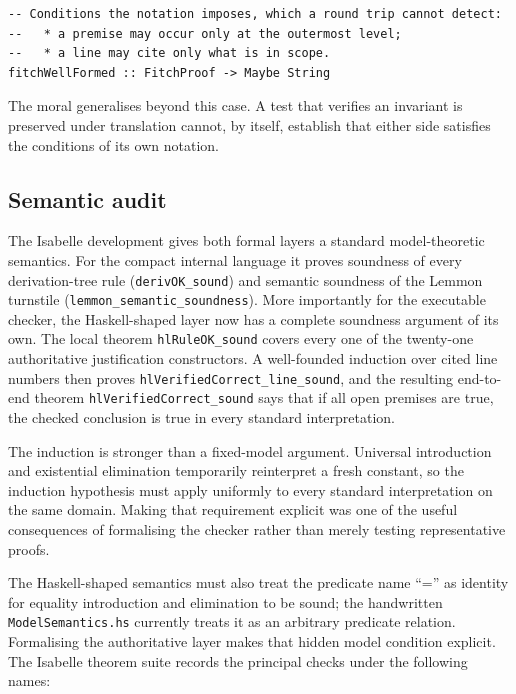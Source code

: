 \documentclass[11pt]{article}
\theoremstyle{plain}
\theoremstyle{definition}
\theoremstyle{remark}
\begin{document}
\begin{lstlisting}
-- Conditions the notation imposes, which a round trip cannot detect:
--   * a premise may occur only at the outermost level;
--   * a line may cite only what is in scope.
fitchWellFormed :: FitchProof -> Maybe String
\end{lstlisting}

\noindent The moral generalises beyond this case. A test that verifies an
invariant is preserved under translation cannot, by itself, establish that
either side satisfies the conditions of its own notation.

\subsection{Semantic audit}

The Isabelle development gives both formal layers a standard model-theoretic
semantics.  For the compact internal language it proves soundness of every
derivation-tree rule (\texttt{derivOK\allowbreak\_sound}) and semantic soundness of the
Lemmon turnstile (\verb|lemmon_semantic_soundness|).  More importantly for the
executable checker, the Haskell-shaped layer now has a complete soundness
argument of its own.  The local theorem \verb|hlRuleOK_sound| covers every one
of the twenty-one authoritative justification constructors.  A well-founded
induction over cited line numbers then proves
\texttt{hlVerifiedCorrect\allowbreak\_line\allowbreak\_sound}, and the
resulting end-to-end theorem
\texttt{hlVerifiedCorrect\allowbreak\_sound} says that
if all open premises are true, the checked conclusion is true in every standard
interpretation.

The induction is stronger than a fixed-model argument.  Universal
introduction and existential elimination temporarily reinterpret a fresh
constant, so the induction hypothesis must apply uniformly to every standard
interpretation on the same domain.  Making that requirement explicit was one
of the useful consequences of formalising the checker rather than merely
testing representative proofs.

The Haskell-shaped semantics must also treat the predicate name ``='' as
identity for equality introduction and elimination to be sound; the
handwritten \verb|ModelSemantics.hs| currently treats it as an arbitrary
predicate relation. Formalising the authoritative layer makes that hidden
model condition explicit. The Isabelle theorem suite records the principal
checks under the following names:
\end{document}
